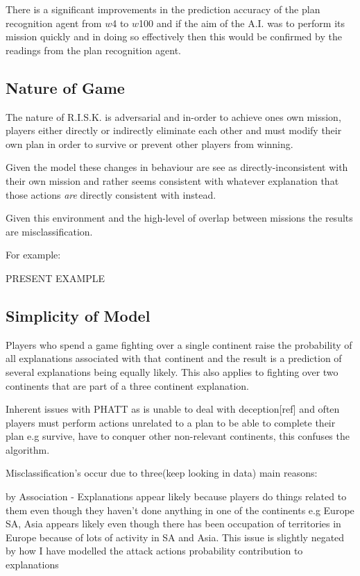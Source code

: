 \documentclass[parskip]{cs4rep}
\begin{document}
There is a significant improvements in the prediction accuracy of the plan recognition agent from $w$4 to $w$100 and if the aim of the A.I. was to perform its mission quickly and in doing so effectively then this would be confirmed by the readings from the plan recognition agent.

\subsection{Nature of Game}

The nature of R.I.S.K. is adversarial and in-order to achieve ones own mission, players either directly or indirectly eliminate each other and must modify their own plan in order to survive or prevent other players from winning. 

Given the model these changes in behaviour are see as directly-inconsistent with their own mission and rather seems consistent with whatever explanation that those actions \textit{are} directly consistent with instead.

Given this environment and the high-level of overlap between missions the results are misclassification.

For example:

PRESENT EXAMPLE

\subsection{Simplicity of Model}

Players who spend a game fighting over a single continent raise the probability of all explanations associated with that continent and the result is a prediction of several explanations being equally likely. This also applies to fighting over two continents that are part of a three continent explanation.

Inherent issues with PHATT as is unable to deal with deception[ref] and often players must perform actions unrelated to a plan to be able to complete their plan e.g survive, have to conquer other non-relevant continents, this confuses the algorithm.

Misclassification's occur due to three(keep looking in data) main reasons:

by Association - Explanations appear likely because players do things related to them even though they haven't done anything in one of the continents e.g Europe SA, Asia appears likely even though there has been occupation of territories in Europe because of lots of activity in SA and Asia. This issue is slightly negated by how I have modelled the attack actions probability contribution to explanations
\end{document}
